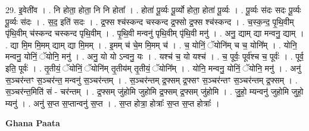 \documentclass[17pt]{extarticle}
\begin{document}
29. इ॒वेती॑व । . नि होता॒ होता॒ नि नि होता᳚ । . होता॑ पू॒र्व्यः पू॒र्व्यो होता॒ होता॑ पू॒र्व्यः । . पू॒र्व्यः स॑दः सदः पू॒र्व्यः पू॒र्व्यः स॑दः । . स॒द॒ इति॑ सदः । . द्र॒फ्स श्च॑स्कन्द चस्कन्द द्र॒फ्सो द्र॒फ्स श्च॑स्कन्द । . च॒स्क॒न्द॒ पृ॒थि॒वीम् पृ॑थि॒वीम् च॑स्कन्द चस्कन्द पृथि॒वीम् । . पृ॒थि॒वी मन्वनु॑ पृथि॒वीम् पृ॑थि॒वी मनु॑ । . अनु॒ द्याम् द्या मन्वनु॒ द्याम् । . द्या मि॒म मि॒मम् द्याम् द्या मि॒मम् । . इ॒मम् च॑ चे॒म मि॒मम् च॑ । . च॒ योनिं॒ ॅयोनि॑म् च च॒ योनि᳚म् । . योनि॒ मन्वनु॒ योनिं॒ ॅयोनि॒ मनु॑ । . अनु॒ यो यो ऽन्वनु॒ यः । . यश्च॑ च॒ यो यश्च॑ । . च॒ पूर्वः॒ पूर्व॑श्च च॒ पूर्वः॑ । . पूर्व॒ इति॒ पूर्वः॑ । . तृ॒तीयं॒ ॅयोनिं॒ ॅयोनि॑म् तृ॒तीय॑म् तृ॒तीयं॒ ॅयोनि᳚म् । . योनि॒ मन्वनु॒ योनिं॒ ॅयोनि॒ मनु॑ । . अनु॑ स॒ञ्चर॑न्तꣳ स॒ञ्चर॑न्त॒ मन्वनु॑ स॒ञ्चर॑न्तम् । . स॒ञ्चर॑न्तम् द्र॒फ्सम् द्र॒फ्सꣳ स॒ञ्चर॑न्तꣳ स॒ञ्चर॑न्तम् द्र॒फ्सम् । . स॒ञ्चर॑न्त॒मिति॑ सं - चर॑न्तम् । . द्र॒फ्सम् जु॑होमि जुहोमि द्र॒फ्सम् द्र॒फ्सम् जु॑होमि । . जु॒हो॒ म्यन्वनु॑ जुहोमि जुहो॒ म्यनु॑ । . अनु॑ स॒प्त स॒प्तान्वनु॑ स॒प्त । . स॒प्त होत्रा॒ होत्राः᳚ स॒प्त स॒प्त होत्राः᳚ । \newline

\textbf{Ghana Paata } \newline
\end{document}
